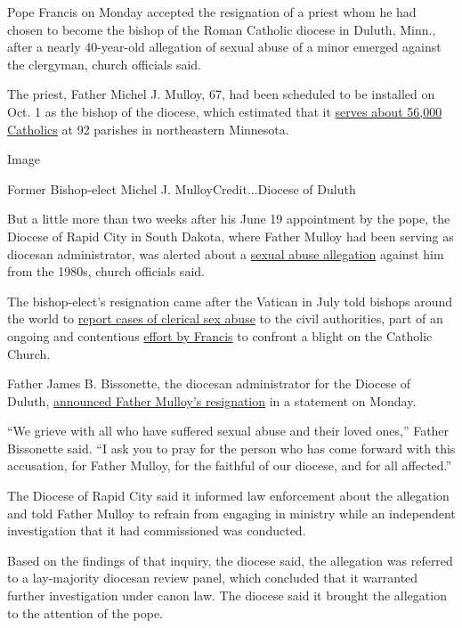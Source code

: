 Pope Francis on Monday accepted the resignation of a priest whom he had
chosen to become the bishop of the Roman Catholic diocese in Duluth,
Minn., after a nearly 40-year-old allegation of sexual abuse of a minor
emerged against the clergyman, church officials said.

The priest, Father Michel J. Mulloy, 67, had been scheduled to be
installed on Oct. 1 as the bishop of the diocese, which estimated that
it \href{https://www.dioceseduluth.org/About-Us}{serves about 56,000
Catholics} at 92 parishes in northeastern Minnesota.

Image

Former Bishop-elect Michel J. MulloyCredit...Diocese of Duluth

But a little more than two weeks after his June 19 appointment by the
pope, the Diocese of Rapid City in South Dakota, where Father Mulloy had
been serving as diocesan administrator, was alerted about a
\href{https://www.rapidcitydiocese.org/wp-content/uploads/2020/09/Statement-MM4.pdf}{sexual
abuse allegation} against him from the 1980s, church officials said.

The bishop-elect's resignation came after the Vatican in July told
bishops around the world to
\href{https://www.nytimes3xbfgragh.onion/2020/07/16/world/europe/vatican-new-sex-abuse-rules.html}{report
cases of clerical sex abuse} to the civil authorities, part of an
ongoing and contentious
\href{https://www.nytimes3xbfgragh.onion/2019/05/09/world/europe/pope-francis-abuse-catholic-church.html?action=click\&module=RelatedLinks\&pgtype=Article}{effort
by Francis} to confront a blight on the Catholic Church.

Father James B. Bissonette, the diocesan administrator for the Diocese
of Duluth,
\href{https://www.dioceseduluth.org/blog/Daily-News/statement-regarding-the-resignation-of-bishop-elect-michel-mulloy}{announced
Father Mulloy's resignation} in a statement on Monday.

``We grieve with all who have suffered sexual abuse and their loved
ones,'' Father Bissonette said. ``I ask you to pray for the person who
has come forward with this accusation, for Father Mulloy, for the
faithful of our diocese, and for all affected.''

The Diocese of Rapid City said it informed law enforcement about the
allegation and told Father Mulloy to refrain from engaging in ministry
while an independent investigation that it had commissioned was
conducted.

Based on the findings of that inquiry, the diocese said, the allegation
was referred to a lay-majority diocesan review panel, which concluded
that it warranted further investigation under canon law. The diocese
said it brought the allegation to the attention of the pope.

